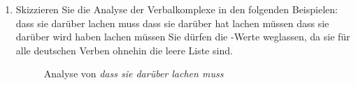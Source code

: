 \begin{enumerate}
\item Skizzieren Sie die Analyse der Verbalkomplexe in den folgenden Beispielen:
\eal
\ex dass sie darüber lachen muss
\ex dass sie darüber hat lachen müssen
\ex dass sie darüber wird haben lachen müssen
\zl
Sie dürfen die \spr-Werte weglassen, da sie für alle deutschen Verben ohnehin die leere Liste sind.


\begin{figure}
\caption{Analyse von \emph{dass sie darüber lachen muss}}
\end{figure}



\end{enumerate}
